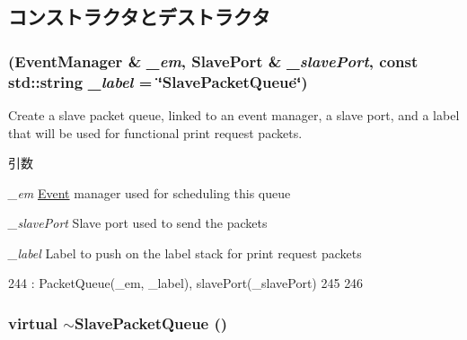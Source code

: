 \subsection{コンストラクタとデストラクタ}
\hypertarget{classSlavePacketQueue_ab854538542cd0a534f1518cbdab944af}{
\subsubsection[{SlavePacketQueue}]{ ({\bf EventManager} \& {\em \_\-em}, \/  {\bf SlavePort} \& {\em \_\-slavePort}, \/  const std::string {\em \_\-label} = {\ttfamily \char`\"{}SlavePacketQueue\char`\"{}})}}
\label{classSlavePacketQueue_ab854538542cd0a534f1518cbdab944af}
Create a slave packet queue, linked to an event manager, a slave port, and a label that will be used for functional print request packets.


\begin{DoxyParams}{引数}
\item[{\em \_\-em}]\hyperlink{classEvent}{Event} manager used for scheduling this queue \item[{\em \_\-slavePort}]Slave port used to send the packets \item[{\em \_\-label}]Label to push on the label stack for print request packets \end{DoxyParams}



\begin{DoxyCode}
244     : PacketQueue(_em, _label), slavePort(_slavePort)
245 {
246 }
\end{DoxyCode}
\hypertarget{classSlavePacketQueue_ab7d3616b2c677e777c22a55dcf07ea83}{
\subsubsection[{$\sim$SlavePacketQueue}]{\setlength{\rightskip}{0pt plus 5cm}virtual $\sim${\bf SlavePacketQueue} ()}}
\label{classSlavePacketQueue_ab7d3616b2c677e777c22a55dcf07ea83}



